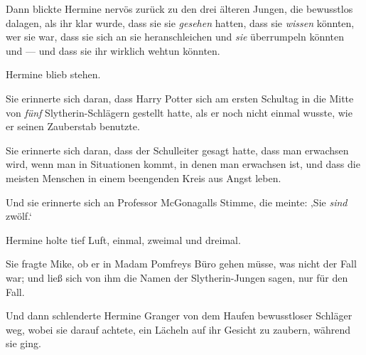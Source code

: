 Dann blickte Hermine nervös zurück zu den drei älteren Jungen, die bewusstlos dalagen, als ihr klar wurde, dass sie sie \emph{gesehen} hatten, dass sie \emph{wissen} könnten, wer sie war, dass sie sich an sie heranschleichen und \emph{sie} überrumpeln könnten und — und dass sie ihr wirklich wehtun könnten.

Hermine blieb stehen.

Sie erinnerte sich daran, dass Harry Potter sich am ersten Schultag in die Mitte von \emph{fünf} Slytherin-Schlägern gestellt hatte, als er noch nicht einmal wusste, wie er seinen Zauberstab benutzte.

Sie erinnerte sich daran, dass der Schulleiter gesagt hatte, dass man erwachsen wird, wenn man in Situationen kommt, in denen man erwachsen ist, und dass die meisten Menschen in einem beengenden Kreis aus Angst leben.

Und sie erinnerte sich an Professor McGonagalls Stimme, die meinte: ‚Sie \emph{sind} zwölf.‘

Hermine holte tief Luft, einmal, zweimal und dreimal.

Sie fragte Mike, ob er in Madam Pomfreys Büro gehen müsse, was nicht der Fall war; und ließ sich von ihm die Namen der Slytherin-Jungen sagen, nur für den Fall.

Und dann schlenderte Hermine Granger von dem Haufen bewusstloser Schläger weg, wobei sie darauf achtete, ein Lächeln auf ihr Gesicht zu zaubern, während sie ging.

